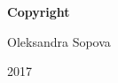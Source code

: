 
\newpage

\thispagestyle{empty}

\vspace*{0.9cm}

\begin{center}

{\bf \Huge Copyright}

\vspace{1cm}


   \Large Oleksandra Sopova\\

   \vspace{0.5cm}


   2017\\

   \vspace{0.5cm}

\end{center}
